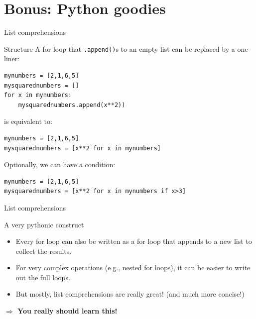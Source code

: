 \documentclass{beamer}
\begin{document}
\section{Bonus: Python goodies}

\begin{frame}[fragile]{List comprehensions}
\begin{block}{Structure}
A for loop that \texttt{.append()}s to an empty list can be replaced by a one-liner:
\end{block}
\begin{lstlisting}
mynumbers = [2,1,6,5]
mysquarednumbers = []
for x in mynumbers:
    mysquarednumbers.append(x**2))
\end{lstlisting}
is equivalent to:
\begin{lstlisting}
mynumbers = [2,1,6,5]
mysquarednumbers = [x**2 for x in mynumbers]
\end{lstlisting}

\pause 
Optionally, we can have a condition:
\begin{lstlisting}
mynumbers = [2,1,6,5]
mysquarednumbers = [x**2 for x in mynumbers if x>3]
\end{lstlisting}

\end{frame}




\begin{frame}[fragile]{List comprehensions}
	\begin{alertblock}{A very pythonic construct}
		\begin{itemize}
			\item Every for loop can also be written as a for loop that appends to a new list to collect the results. 
			\item For very complex operations (e.g., nested for loops), it can be easier to write out the full loops. 
			\item But mostly, list comprehensions are really great! (and much more concise!)
		\end{itemize}
	\end{alertblock}
\textbf{$\Rightarrow$ You really should learn this!}
	\end{frame}
\end{document}
